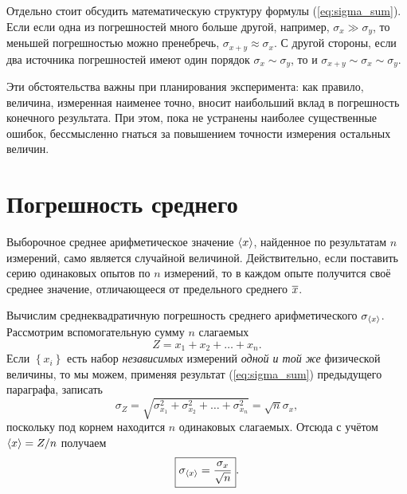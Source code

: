 Отдельно стоит обсудить математическую структуру формулы (\ref{eq:sigma_sum}).
Если если одна из погрешностей много больше другой, например,
$\sigma_{x}\gg\sigma_{y}$,
то меньшей погрешностью можно пренебречь, $\sigma_{x+y}\approx\sigma_{x}$.
С другой стороны, если два источника погрешностей имеют один порядок
$\sigma_{x}\sim\sigma_{y}$, то и $\sigma_{x+y}\sim\sigma_{x}\sim\sigma_{y}$.

Эти обстоятельства важны при планирования эксперимента: как правило,
величина, измеренная наименее точно, вносит наибольший вклад в погрешность
конечного результата. При этом, пока не устранены наиболее существенные
ошибок, бессмысленно гнаться за повышением точности измерения остальных
величин.


\section{Погрешность среднего}\label{sec:average}

Выборочное среднее арифметическое значение $\left<x\right>$, найденное
по результатам $n$ измерений, само является случайной величиной.
Действительно, если поставить серию одинаковых опытов по $n$ измерений,
то в каждом опыте получится своё среднее значение, отличающееся от
предельного среднего $\overline{x}$.

Вычислим среднеквадратичную погрешность среднего арифметического
$\sigma_{\left<x\right>}$.
Рассмотрим вспомогательную сумму $n$ слагаемых
\[
    Z=x_{1}+x_{2}+\ldots+x_{n}.
\]
Если $\left\{ x_{i}\right\} $ есть набор \emph{независимых} измерений
\emph{одной и той же} физической величины, то мы можем, применяя результат
(\ref{eq:sigma_sum}) предыдущего параграфа, записать
\[
    \sigma_{Z}=\sqrt{\sigma_{x_{1}}^{2}+\sigma_{x_{2}}^{2}+\ldots+\sigma_{x_{n}}^{2}
    }=\sqrt{n}\sigma_{x},
\]
поскольку под корнем находится $n$ одинаковых слагаемых. Отсюда с
учётом $\left<x\right>=Z/n$ получаем
\begin{equation}
\boxed{{\sigma_{\left<x\right>}=\frac{\sigma_{x}}{\sqrt{n}}}}.\label{eq:sigma_avg}
\end{equation}

